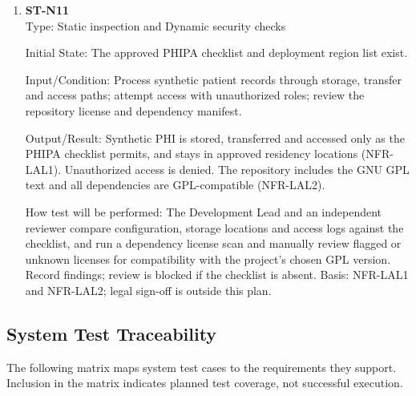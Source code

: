 \documentclass[12pt, titlepage]{article}
\begin{document}
\begin{enumerate}
    \item \textbf{ST-N11}\\

    Type: Static inspection and Dynamic security checks

    Initial State: The approved PHIPA checklist and deployment region list
    exist.

    Input/Condition: Process synthetic patient records through storage,
    transfer and access paths; attempt access with unauthorized roles; review
    the repository license and dependency manifest.

    Output/Result: Synthetic PHI is stored, transferred and accessed only as
    the PHIPA checklist permits, and stays in approved residency locations
    (NFR-LAL1). Unauthorized access is denied. The repository includes the
    GNU GPL text and all dependencies are GPL-compatible (NFR-LAL2).

    How test will be performed: The Development Lead and an independent
    reviewer compare configuration, storage locations and access logs against
    the checklist, and run a dependency license scan and manually review flagged 
    or unknown licenses for compatibility with the project's chosen GPL version. 
    Record findings; review is blocked if the checklist is absent. Basis: NFR-LAL1 
    and NFR-LAL2; legal sign-off is outside this plan.
\end{enumerate}

\subsection{System Test Traceability}\label{sec:system-traceability}

The following matrix maps system test cases to the requirements
they support. Inclusion in the matrix indicates planned test
coverage, not successful execution.
\end{document}
